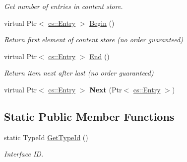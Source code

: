 \begin{DoxyCompactItemize}
\begin{DoxyCompactList}\small\item\em Get number of entries in content store. \end{DoxyCompactList}\item 
virtual Ptr$<$ \hyperlink{classns3_1_1ndn_1_1cs_1_1Entry}{cs\+::\+Entry} $>$ \hyperlink{classns3_1_1ndn_1_1cs_1_1Nocache_a6a03e310cd7ededaac72ab7a9a8d41ec}{Begin} ()\hypertarget{classns3_1_1ndn_1_1cs_1_1Nocache_a6a03e310cd7ededaac72ab7a9a8d41ec}{}\label{classns3_1_1ndn_1_1cs_1_1Nocache_a6a03e310cd7ededaac72ab7a9a8d41ec}

\begin{DoxyCompactList}\small\item\em Return first element of content store (no order guaranteed) \end{DoxyCompactList}\item 
virtual Ptr$<$ \hyperlink{classns3_1_1ndn_1_1cs_1_1Entry}{cs\+::\+Entry} $>$ \hyperlink{classns3_1_1ndn_1_1cs_1_1Nocache_acb78839d2fafd7ababe04e153718cf94}{End} ()\hypertarget{classns3_1_1ndn_1_1cs_1_1Nocache_acb78839d2fafd7ababe04e153718cf94}{}\label{classns3_1_1ndn_1_1cs_1_1Nocache_acb78839d2fafd7ababe04e153718cf94}

\begin{DoxyCompactList}\small\item\em Return item next after last (no order guaranteed) \end{DoxyCompactList}\item 
virtual Ptr$<$ \hyperlink{classns3_1_1ndn_1_1cs_1_1Entry}{cs\+::\+Entry} $>$ {\bfseries Next} (Ptr$<$ \hyperlink{classns3_1_1ndn_1_1cs_1_1Entry}{cs\+::\+Entry} $>$)\hypertarget{classns3_1_1ndn_1_1cs_1_1Nocache_ab1a30fb4ff2df5653380a81f9434618c}{}\label{classns3_1_1ndn_1_1cs_1_1Nocache_ab1a30fb4ff2df5653380a81f9434618c}

\end{DoxyCompactItemize}
\subsection*{Static Public Member Functions}
\begin{DoxyCompactItemize}
\item 
static Type\+Id \hyperlink{classns3_1_1ndn_1_1cs_1_1Nocache_a0d3dc77f62db3610f57152a594288c9e}{Get\+Type\+Id} ()
\begin{DoxyCompactList}\small\item\em Interface ID. \end{DoxyCompactList}\end{DoxyCompactItemize}
